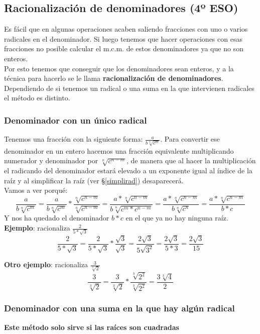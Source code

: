 \documentclass[a4paper,11pt,answers]{exam}
\begin{document}
\subsection{Racionalización de denominadores (4º ESO)}
Es fácil que en algunas operaciones acaben saliendo fracciones con uno o varios radicales en el denominador. Si luego tenemos que hacer operaciones con esas fracciones no posible calcular el m.c.m. de estos denominadores ya que no son enteros.\\
Por esto tenemos que conseguir que los denominadores sean enteros, y a la técnica para hacerlo se le llama \textbf{racionalización de denominadores}.\\

Dependiendo de si tenemos un radical o una suma en la que intervienen radicales el método es distinto.
\subsubsection{Denominador con un único radical}
Tenemos una fracción con la siguiente forma: $\frac{a}{b\sqrt[n]{c^m}}$. Para convertir ese denominador en un entero hacemos una fracción equivalente multiplicando numerador y denominador por $\sqrt[n]{c^{n-m}}$, de manera que al hacer la multiplicación el radicando del denominador estará elevado a un exponente igual al índice de la raíz y al simplificar la raíz (ver \S\ref{simplirad}) desaparecerá.\\
Vamos a ver porqué:
\[\frac{a}{b\sqrt[n]{c^m}} = \frac{a}{b\sqrt[n]{c^m}} * \frac{\sqrt[n]{c^{n-m}}}{\sqrt[n]{c^{n-m}}} = 
\frac{a * \sqrt[n]{c^{n-m}}}{b \sqrt[n]{c^m * c^{n-m}}} = \frac{a * \sqrt[n]{c^{n-m}}}{b \sqrt[n]{c^n}} =
\frac{a * \sqrt[n]{c^{n-m}}}{b * c}\]
Y nos ha quedado el denominador $b*c$ en el que ya no hay ninguna raíz.\\

\textbf{Ejemplo}: racionaliza $\frac{2}{5*\sqrt{3}}$
\[\frac{2}{5*\sqrt{3}} = \frac{2}{5*\sqrt{3}}* \frac{\sqrt{3}}{\sqrt{3}} = \frac{2 \sqrt{3}}{5\sqrt{3^2}} =
\frac{2\sqrt{3}}{5* 3} = \frac{2\sqrt{3}}{15}\]

\textbf{Otro ejemplo}: racionaliza $\frac{3}{\sqrt[3]{2}}$
\[\frac{3}{\sqrt[3]{2}} = \frac{3}{\sqrt[3]{2}}* \frac{\sqrt[3]{2^2}}{\sqrt[3]{2^2}} =
\frac{3\sqrt[3]{4}}{2}\]

\subsubsection{Denominador con una suma en la que hay algún radical}
\textbf{Este método solo sirve si las raíces son cuadradas}\\
\end{document}
